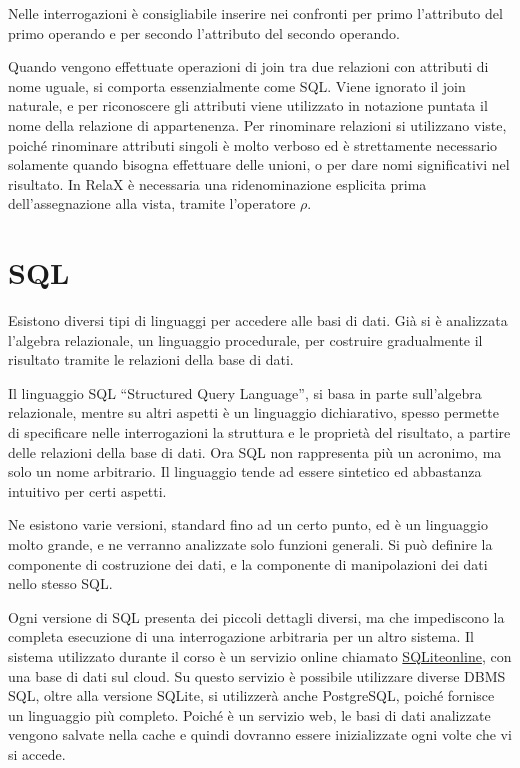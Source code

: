 \documentclass{article}
\numberwithin{equation}{subsection}
\begin{document}
Nelle interrogazioni è consigliabile inserire nei confronti per primo l'attributo del primo operando e per secondo l'attributo del secondo operando. 

Quando vengono effettuate operazioni di join tra due relazioni con attributi di nome uguale, si comporta essenzialmente come SQL. Viene ignorato il join naturale, e per riconoscere gli attributi viene utilizzato 
in notazione puntata il nome della relazione di appartenenza. Per rinominare relazioni si utilizzano viste, poiché rinominare attributi singoli è molto verboso ed è strettamente necessario solamente quando 
bisogna effettuare delle unioni, o per dare nomi significativi nel risultato. In RelaX è necessaria una ridenominazione esplicita prima dell'assegnazione alla vista, tramite l'operatore $\rho$. 

\clearpage

\section{SQL}

Esistono diversi tipi di linguaggi per accedere alle basi di dati. Già si è analizzata l'algebra relazionale, un linguaggio procedurale, per costruire gradualmente il risultato tramite le relazioni della 
base di dati. 

Il linguaggio SQL ``Structured Query Language'', si basa in parte sull'algebra relazionale, mentre su altri aspetti è un linguaggio dichiarativo, spesso permette di specificare nelle interrogazioni la struttura e le 
proprietà del risultato, a partire delle relazioni della base di dati. Ora SQL non rappresenta più un acronimo, ma solo un nome arbitrario.  
Il linguaggio tende ad essere sintetico ed abbastanza intuitivo per certi aspetti. 

Ne esistono varie versioni, standard fino ad un certo punto, ed è un linguaggio molto grande, e ne verranno analizzate solo funzioni generali. 
Si può definire la componente di costruzione dei dati, e la componente di manipolazioni dei dati nello stesso SQL. 

Ogni versione di SQL presenta dei piccoli dettagli diversi, ma che impediscono la completa esecuzione di una interrogazione arbitraria per un altro sistema. Il sistema utilizzato durante il corso è un servizio 
online chiamato \href{https://sqliteonline.com/}{SQLiteonline}, con una base di dati sul cloud. 
Su questo servizio è possibile utilizzare diverse DBMS SQL, oltre alla versione SQLite, si utilizzerà anche PostgreSQL, poiché fornisce un linguaggio più completo. 
Poiché è un servizio web, le basi di dati analizzate vengono salvate nella cache e quindi dovranno essere inizializzate ogni volte che vi si accede. 
\end{document}
